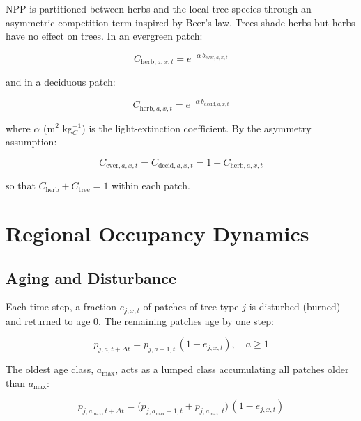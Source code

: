 \documentclass[12pt]{article}
\begin{document}
NPP is partitioned between herbs and the local tree species through an asymmetric
competition term inspired by Beer's law. Trees shade herbs but herbs have no effect
on trees. In an evergreen patch:

\begin{equation}
    C_{\mathrm{herb},a,x,t} = e^{-\alpha\, b_{\mathrm{ever},a,x,t}}
    \label{eq:comp_herb_ever}
\end{equation}

and in a deciduous patch:

\begin{equation}
    C_{\mathrm{herb},a,x,t} = e^{-\alpha\, b_{\mathrm{decid},a,x,t}}
    \label{eq:comp_herb_decid}
\end{equation}

where $\alpha$ (m$^2$ kg$_C^{-1}$) is the light-extinction coefficient. By the
asymmetry assumption:

\begin{equation}
    C_{\mathrm{ever},a,x,t} = C_{\mathrm{decid},a,x,t} = 1 - C_{\mathrm{herb},a,x,t}
\end{equation}

so that $C_{\mathrm{herb}} + C_{\mathrm{tree}} = 1$ within each patch.

\section{Regional Occupancy Dynamics}

\subsection{Aging and Disturbance}

Each time step, a fraction $e_{j,x,t}$ of patches of tree type $j$ is disturbed
(burned) and returned to age 0. The remaining patches age by one step:

\begin{equation}
    p_{j,a,t+\Delta t} = p_{j,a-1,t}\,(1 - e_{j,x,t}), \quad a \geq 1
    \label{eq:occupancy}
\end{equation}

The oldest age class, $a_{\max}$, acts as a lumped class accumulating all patches
older than $a_{\max}$:

\begin{equation}
    p_{j,a_{\max},t+\Delta t} =
        \bigl(p_{j,a_{\max}-1,t} + p_{j,a_{\max},t}\bigr)\,(1 - e_{j,x,t})
\end{equation}
\end{document}
